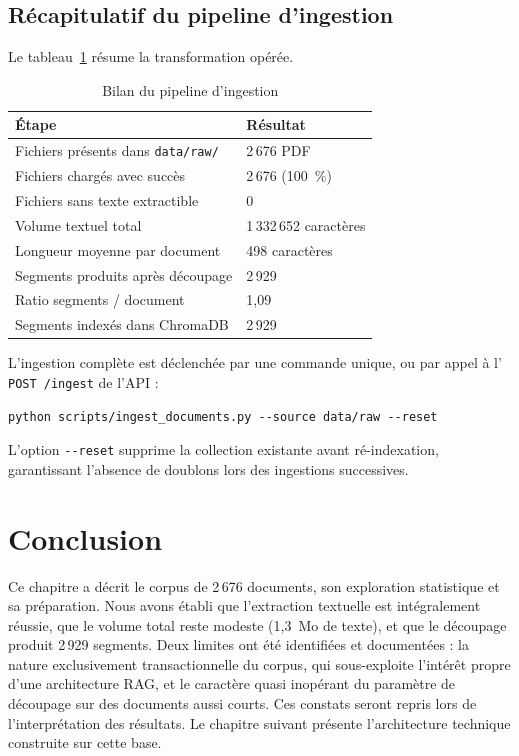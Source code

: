 \subsection{Récapitulatif du pipeline d'ingestion}

Le tableau~\ref{tab:ingestion} résume la transformation opérée.

\begin{table}[htbp]
\centering
\caption{Bilan du pipeline d'ingestion}
\label{tab:ingestion}
\small
\begin{tabularx}{\textwidth}{@{}p{6.2cm}X@{}}
\toprule
\textbf{Étape} & \textbf{Résultat} \\
\midrule
Fichiers présents dans \texttt{data/raw/} & 2\,676 PDF \\
Fichiers chargés avec succès & 2\,676 (100~\%) \\
Fichiers sans texte extractible & 0 \\
Volume textuel total & 1\,332\,652 caractères \\
Longueur moyenne par document & 498 caractères \\
Segments produits après découpage & 2\,929 \\
Ratio segments / document & 1,09 \\
Segments indexés dans ChromaDB & 2\,929 \\
\bottomrule
\end{tabularx}
\end{table}

L'ingestion complète est déclenchée par une commande unique, ou par appel à
l' \texttt{POST /ingest} de l'API :

\begin{lstlisting}[style=bash,caption={Lancement de l'ingestion}]
python scripts/ingest_documents.py --source data/raw --reset
\end{lstlisting}

L'option \texttt{-{}-reset} supprime la collection existante avant
ré-indexation, garantissant l'absence de doublons lors des ingestions
successives.

\section{Conclusion}

Ce chapitre a décrit le corpus de 2\,676 documents, son exploration statistique
et sa préparation. Nous avons établi que l'extraction textuelle est
intégralement réussie, que le volume total reste modeste (1,3~Mo de texte), et
que le découpage produit 2\,929 segments. Deux limites ont été identifiées et
documentées : la nature exclusivement transactionnelle du corpus, qui
sous-exploite l'intérêt propre d'une architecture RAG, et le caractère
quasi inopérant du paramètre de découpage sur des documents aussi courts. Ces
constats seront repris lors de l'interprétation des résultats. Le chapitre
suivant présente l'architecture technique construite sur cette base.
